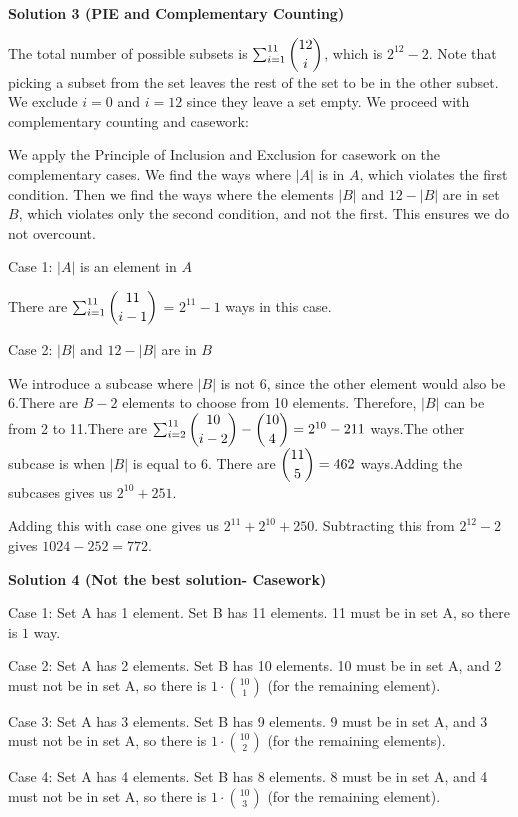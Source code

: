 \begin{enumerate}
\textbf{Solution 3 (PIE and Complementary Counting)}

The total number of possible subsets is $\sum_{i=1}^{11}\dbinom{12}{i}$, which is $2^{12}-2$. Note that picking a subset from the set leaves the rest of the set to be in the other subset. We exclude $i=0$ and $i=12$ since they leave a set empty. We proceed with complementary counting and casework:

 We apply the Principle of Inclusion and Exclusion for casework on the complementary cases. We find the ways where $|A|$ is in $A$, which violates the first condition. Then we find the ways where the elements $|B|$ and $12-|B|$ are in set $B$, which violates only the second condition, and not the first. This ensures we do not overcount.

 Case 1: $|A|$ is an element in $A$

 There are $\sum_{i=1}^{11}\dbinom{11}{i-1}$ = $2^{11}-1$ ways in this case.

 Case 2: $|B|$ and $12-|B|$ are in $B$

 We introduce a subcase where $|B|$ is not 6, since the other element would also be 6.There are $B-2$ elements to choose from 10 elements. Therefore, $|B|$ can be from 2 to 11.There are $\sum_{i=2}^{11}\dbinom{10}{i-2}-\dbinom{10}{4} = 2^{10}-211$ ways.The other subcase is when $|B|$ is equal to 6. There are $\dbinom{11}{5}=462$ ways.Adding the subcases gives us $2^{10}+251$. 

 Adding this with case one gives us $2^{11}+2^{10}+250$. Subtracting this from $2^{12}-2$ gives $1024-252=\boxed{772}$.

 



\textbf{Solution 4 (Not the best solution- Casework)}

Case 1: Set A has 1 element. Set B has 11 elements. 11 must be in set A, so there is $1$ way.

 Case 2: Set A has 2 elements. Set B has 10 elements. 10 must be in set A, and 2 must not be in set A, so there is $1\cdot\binom{10}{1}$ (for the remaining element).

 Case 3: Set A has 3 elements. Set B has 9 elements. 9 must be in set A, and 3 must not be in set A, so there is $1\cdot\binom{10}{2}$ (for the remaining elements).

 Case 4: Set A has 4 elements. Set B has 8 elements. 8 must be in set A, and 4 must not be in set A, so there is $1\cdot\binom{10}{3}$ (for the remaining element).


\end{enumerate}
